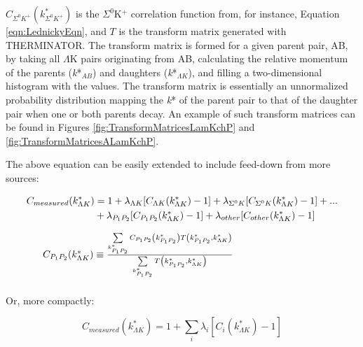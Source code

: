 \documentclass[ALICE,manyauthors]{cernphprep}
\begin{document}
$C_{\Sigma^{0}K^{+}}(k^{*}_{\Sigma^{0}K^{+}})$ is the $\Sigma^{0}$K$^{+}$ correlation function from, for instance, Equation \ref{eqn:LednickyEqn}, and $T$ is the transform matrix generated with THERMINATOR.  The transform matrix is formed for a given parent pair, AB, by taking all $\Lambda$K pairs originating from AB, calculating the relative momentum of the parents (\textit{k}*$_{AB}$) and daughters (\textit{k}*$_{\Lambda K}$), and filling a two-dimensional histogram with the values. The transform matrix is essentially an unnormalized probability distribution mapping the \textit{k}* of the parent pair to that of the daughter pair when one or both parents decay.  An example of such transform matrices can be found in Figures \ref{fig:TransformMatricesLamKchP} and \ref{fig:TransformMatricesALamKchP}.

  The above equation can be easily extended to include feed-down from more sources:

\begin{equation}
\begin{array}{l}
\vspace{4mm}
\begin{split}
 C_{measured}(k^{*}_{\Lambda K}) & = 1 + \lambda_{\Lambda K}[C_{\Lambda K}(k^{*}_{\Lambda K})-1] + \lambda_{\Sigma^{0}K}[C_{\Sigma^{0}K}(k^{*}_{\Lambda K})-1] + ... \\ &
 + \lambda_{P_{1}P_{2}}[C_{P_{1}P_{2}}(k^{*}_{\Lambda K})-1] + \lambda_{other}[C_{other}(k^{*}_{\Lambda K})-1] 
\end{split}
\\
\vspace{2mm}
  ~~~~~C_{P_{1}P_{2}}(k^{*}_{\Lambda K}) \equiv \frac{\sum\limits_{k^{*}_{P_{1}P_{2}}} C_{P_{1}P_{2}}\left(k^{*}_{P_{1}P_{2}}\right) T\left(k^{*}_{P_{1}P_{2}},k^{*}_{\Lambda K}\right)}{\sum\limits_{k^{*}_{P_{1}P_{2}}} T\left(k^{*}_{P_{1}P_{2}},k^{*}_{\Lambda K}\right)}
\end{array} 
\label{eqn:ResidualsFull}
\end{equation}

  Or, more compactly:

\begin{equation}
 C_{measured}(k^{*}_{\Lambda K}) = 1 + \sum\limits_{i}  \lambda_{i}[C_{i}(k^{*}_{\Lambda K})-1]
\label{eqn:Residuals}
\end{equation}
\end{document}
